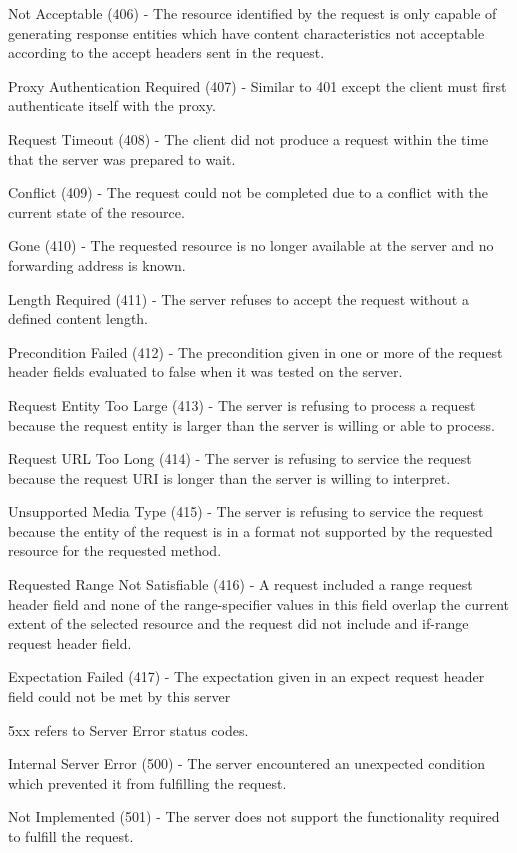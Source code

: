 \documentclass[titlepage]{article}
\begin{document}
Not Acceptable (406) - The resource identified by the request is only capable of generating response entities which have content characteristics not acceptable according to the accept headers sent in the request.

Proxy Authentication Required (407) - Similar to 401 except the client must first authenticate itself with the proxy.

Request Timeout (408) - The client did not produce a request within the time that the server was prepared to wait.

Conflict (409) - The request could not be completed due to a conflict with the current state of the resource.

Gone (410) - The requested resource is no longer available at the server and no forwarding address is known.

Length Required (411) - The server refuses to accept the request without a defined content length.

Precondition Failed (412) - The precondition given in one or more of the request header fields evaluated to false when it was tested on the server. 

Request Entity Too Large (413) - The server is refusing to process a request because the request entity is larger than the server is willing or able to process.

Request URL Too Long (414) - The server is refusing to service the request because the request URI is longer than the server is willing to interpret.

Unsupported Media Type (415) - The server is refusing to service the request because the entity of the request is in a format not supported by the requested resource for the requested method.

Requested Range Not Satisfiable (416) - A request included a range request header field and none of the range-specifier values in this field overlap the current extent of the selected resource and the request did not include and if-range request header field.

Expectation Failed (417) - The expectation given in an expect request header field could not be met by this server

5xx refers to Server Error status codes.

Internal Server Error (500) - The server encountered an unexpected condition which prevented it from fulfilling the request.

Not Implemented (501) - The server does not support the functionality required to fulfill the request.
\end{document}
